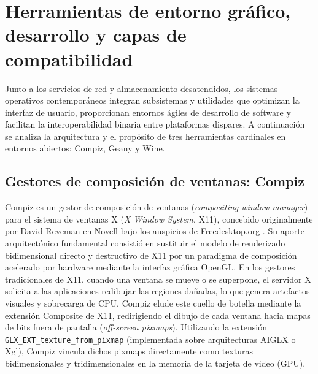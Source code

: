 \documentclass[12pt]{article}
\begin{document}
\section{Herramientas de entorno gráfico, desarrollo y capas de compatibilidad}
\label{sec:herramientasGraficoDesarrollo}

Junto a los servicios de red y almacenamiento desatendidos, los sistemas operativos contemporáneos integran subsistemas y utilidades que optimizan la interfaz de usuario, proporcionan entornos ágiles de desarrollo de software y facilitan la interoperabilidad binaria entre plataformas dispares. A continuación se analiza la arquitectura y el propósito de tres herramientas cardinales en entornos abiertos: Compiz, Geany y Wine.

\subsection{Gestores de composición de ventanas: Compiz}
\label{sec:compiz}

Compiz es un gestor de composición de ventanas (\textit{compositing window manager}) para el sistema de ventanas X (\textit{X Window System}, X11), concebido originalmente por David Reveman en Novell bajo los auspicios de Freedesktop.org \parencite{compizOverview}. Su aporte arquitectónico fundamental consistió en sustituir el modelo de renderizado bidimensional directo y destructivo de X11 por un paradigma de composición acelerado por hardware mediante la interfaz gráfica OpenGL. En los gestores tradicionales de X11, cuando una ventana se mueve o se superpone, el servidor X solicita a las aplicaciones redibujar las regiones dañadas, lo que genera artefactos visuales y sobrecarga de CPU. Compiz elude este cuello de botella mediante la extensión Composite de X11, redirigiendo el dibujo de cada ventana hacia mapas de bits fuera de pantalla (\textit{off-screen pixmaps}). Utilizando la extensión \texttt{GLX\_EXT\_texture\_from\_pixmap} (implementada sobre arquitecturas AIGLX o Xgl), Compiz vincula dichos pixmaps directamente como texturas bidimensionales y tridimensionales en la memoria de la tarjeta de video (GPU).
\end{document}
